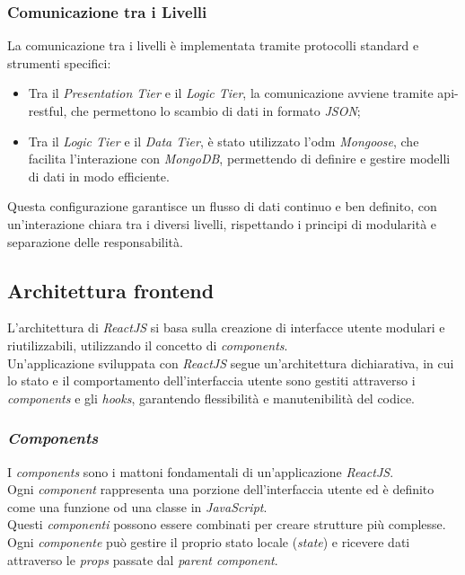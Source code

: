 \subsubsection{Comunicazione tra i Livelli}

\noindent La comunicazione tra i livelli è implementata tramite protocolli standard e strumenti specifici:
\begin{itemize}
    \item Tra il \textit{Presentation Tier} e il \textit{Logic Tier}, la comunicazione avviene tramite \gls{api-restful}, che permettono lo scambio di dati in formato \textit{JSON};
    \item Tra il \textit{Logic Tier} e il \textit{Data Tier}, è stato utilizzato l'\gls{odm} \textit{Mongoose}, che facilita l'interazione con \textit{MongoDB}, permettendo di definire e gestire modelli di dati in modo efficiente.
\end{itemize}

\noindent Questa configurazione garantisce un flusso di dati continuo e ben definito, con un'interazione chiara tra i diversi livelli, rispettando i principi di modularità e separazione delle responsabilità.

\pagebreak

\subsection*{Architettura \gls{frontend}}

L'architettura di \textit{ReactJS} si basa sulla creazione di interfacce utente modulari e riutilizzabili, utilizzando il concetto di \textit{components}. \\
Un'applicazione sviluppata con \textit{ReactJS} segue un'architettura dichiarativa, in cui lo stato e il comportamento dell'interfaccia utente sono gestiti attraverso i \textit{components} e gli \textit{hooks}, garantendo flessibilità e manutenibilità del codice.

\subsubsection{\textit{Components}}

I \textit{components} sono i mattoni fondamentali di un'applicazione \textit{ReactJS}.\\
Ogni \textit{component} rappresenta una porzione dell'interfaccia utente ed è definito come una funzione od una classe in \textit{JavaScript}.\\
Questi \textit{componenti} possono essere combinati per creare strutture più complesse.\\
Ogni \textit{componente} può gestire il proprio stato locale (\textit{state}) e ricevere dati attraverso le \textit{props} passate dal \textit{parent component}. \\

